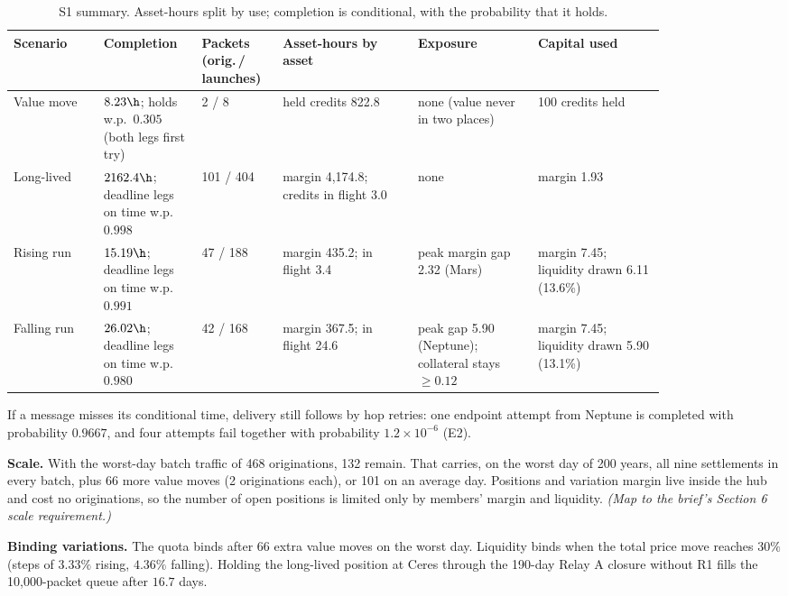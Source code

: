 \begin{table}[H]
\centering
\caption{S1 summary. Asset-hours split by use; completion is conditional, with the probability that it holds.}\label{tab:s1sum}
\small
\begin{tabular}{@{}p{0.12\linewidth}p{0.12\linewidth}p{0.09\linewidth}p{0.18\linewidth}p{0.16\linewidth}p{0.17\linewidth}@{}}
\toprule
Scenario & Completion & Packets (orig.\,/ launches) & Asset-hours by asset & Exposure & Capital used \\
\midrule
Value move & $8.23\h$; holds w.p.\ $0.305$ (both legs first try) & 2 / 8 & held credits 822.8 & none (value never in two places) & 100 credits held \\
Long-lived & $2162.4\h$; deadline legs on time w.p.\ $0.998$ & 101 / 404 & margin 4{,}174.8; credits in flight 3.0 & none & margin 1.93 \\
Rising run & $15.19\h$; deadline legs on time w.p.\ $0.991$ & 47 / 188 & margin 435.2; in flight 3.4 & peak margin gap 2.32 (Mars) & margin 7.45; liquidity drawn 6.11 (13.6\%) \\
Falling run & $26.02\h$; deadline legs on time w.p.\ $0.980$ & 42 / 168 & margin 367.5; in flight 24.6 & peak gap 5.90 (Neptune); collateral stays $\ge0.12$ & margin 7.45; liquidity drawn 5.90 (13.1\%) \\
\bottomrule
\end{tabular}
\end{table}
If a message misses its conditional time, delivery still follows by hop retries: one endpoint attempt from Neptune is completed with probability $0.9667$, and four attempts fail together with probability $1.2\times10^{-6}$ (E2).

\textbf{Scale.} With the worst-day batch traffic of 468 originations, 132 remain. That carries, on the worst day of 200 years, all nine settlements in every batch, plus 66 more value moves (2 originations each), or 101 on an average day. Positions and variation margin live inside the hub and cost no originations, so the number of open positions is limited only by members' margin and liquidity. \emph{(Map to the brief's Section 6 scale requirement.)}

\textbf{Binding variations.} The quota binds after 66 extra value moves on the worst day. Liquidity binds when the total price move reaches $30\%$ (steps of $3.33\%$ rising, $4.36\%$ falling). Holding the long-lived position at Ceres through the 190-day Relay A closure without R1 fills the 10{,}000-packet queue after $16.7$ days.

